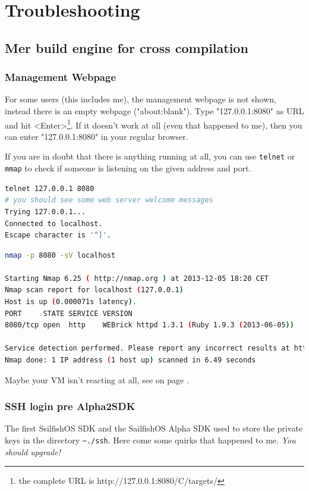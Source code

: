 %
\section{Troubleshooting}\label{sec:troubleshooting}
%
\subsection{Mer build engine for cross compilation}\label{subset:ts:mersdk}
%
\subsubsection{Management Webpage}
%
For some users (this includes me), the management webpage is not shown, instead there is an empty webpage ("about:blank"). Type "127.0.0.1:8080" as URL and hit <Enter>\footnote{the complete URL is http://127.0.0.1:8080/C/targets/}. If it doesn't work at all (even that happened to me), then you can enter "127.0.0.1:8080" in your regular browser.

If you are in doubt that there is anything running at all, you can use \verb,telnet, or \verb,mmap,\cite{nm01} to check if someone is listening on the given address and port.
%
\begin{lstlisting}[language=bash]
telnet 127.0.0.1 8080
# you should see some web server welcome messages
Trying 127.0.0.1...
Connected to localhost.
Escape character is '^]'.
\end{lstlisting}
%
\begin{lstlisting}[language=bash]
nmap -p 8080 -sV localhost

Starting Nmap 6.25 ( http://nmap.org ) at 2013-12-05 18:20 CET
Nmap scan report for localhost (127.0.0.1)
Host is up (0.000071s latency).
PORT     STATE SERVICE VERSION
8080/tcp open  http    WEBrick httpd 1.3.1 (Ruby 1.9.3 (2013-06-05))

Service detection performed. Please report any incorrect results at http://nmap.org/submit/ .
Nmap done: 1 IP address (1 host up) scanned in 6.49 seconds
\end{lstlisting}
%
Maybe your VM isn't reacting at all, see  on page \pageref{subsubsec:ts:slowmersdk}.
%
%
\subsubsection{SSH login pre Alpha2SDK}
%
The first SsilfishOS SDK and the SailfishOS Alpha SDK used to store the private keys in the directory \verb,~./ssh,. Here come some quirks that happened to me. \emph{You should upgrade!}

